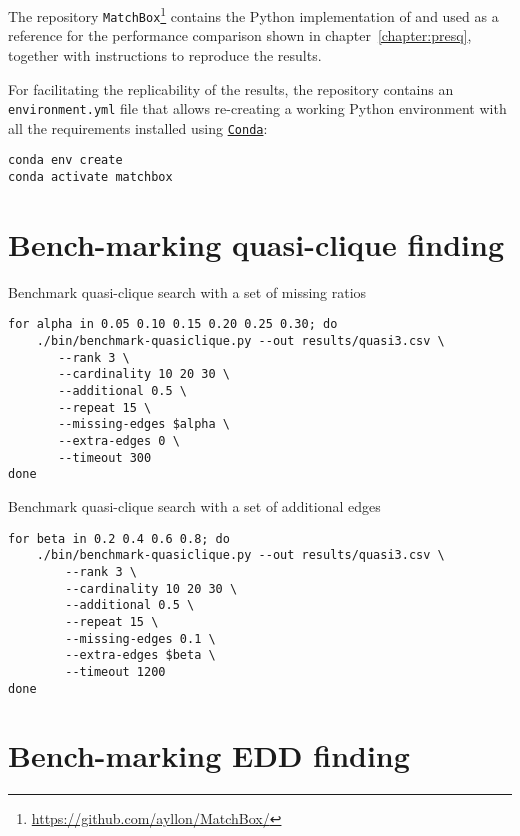 The repository \texttt{MatchBox}\footnote{\url{https://github.com/ayllon/MatchBox/}}
contains the Python implementation of \PresQ and \Find used as a reference for the
performance comparison shown in chapter~\ref{chapter:presq}, together with instructions
to reproduce the results.

For facilitating the replicability of the results, the repository contains an \linebreak
\texttt{environment.yml} file that allows re-creating a working Python environment
with all the requirements installed using \href{https://docs.conda.io/en/latest/}{\texttt{Conda}}:

\begin{verbatim}
conda env create
conda activate matchbox
\end{verbatim}

\section{Bench-marking quasi-clique finding}

\begin{code}
\label{script:quasi_missing}
\caption{Benchmark quasi-clique search with a set of missing ratios}
\begin{verbatim}
for alpha in 0.05 0.10 0.15 0.20 0.25 0.30; do
    ./bin/benchmark-quasiclique.py --out results/quasi3.csv \
       --rank 3 \
       --cardinality 10 20 30 \
       --additional 0.5 \
       --repeat 15 \
       --missing-edges $alpha \
       --extra-edges 0 \
       --timeout 300
done
\end{verbatim}
\end{code}

\begin{code}
\label{script:quasi_spurious}
\caption{Benchmark quasi-clique search with a set of additional edges}
\begin{verbatim}
for beta in 0.2 0.4 0.6 0.8; do
    ./bin/benchmark-quasiclique.py --out results/quasi3.csv \
        --rank 3 \
        --cardinality 10 20 30 \
        --additional 0.5 \
        --repeat 15 \
        --missing-edges 0.1 \
        --extra-edges $beta \
        --timeout 1200
done
\end{verbatim}
\end{code}

\section{Bench-marking EDD finding}